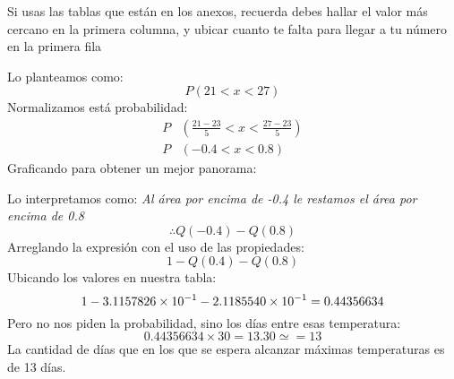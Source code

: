 \documentclass[
	12pt, %
	fleqn, %
	a4paper, %
	oneside, %
]{LegrandOrangeBook}
\begin{document}
\begin{remark}
Si usas las tablas que están en los anexos, recuerda debes hallar el valor más cercano en la primera columna, y ubicar cuanto te falta para llegar a tu  número en la primera fila
\end{remark}
\begin{example}
Lo planteamos como:
\begin{displaymath}
P(21<x<27)
\end{displaymath}
Normalizamos está probabilidad:
\begin{align*}
P&\left(\frac{21-23}{5}<x<\frac{27-23}{5}\right)\\
P&(-0.4<x<0.8)
\end{align*}
Graficando para obtener un mejor panorama:
\begin{center}
\end{center}
Lo interpretamos como: \emph{Al área por encima de -0.4 le restamos el área por encima de 0.8}
\begin{displaymath}
\therefore Q(-0.4)-Q(0.8)
\end{displaymath}
Arreglando la expresión con el uso de las propiedades:
\begin{displaymath}
1-Q(0.4)-Q(0.8)
\end{displaymath}
Ubicando los valores en nuestra tabla:
\begin{displaymath}
1-3.1157826\times 10^{-1}-2.1185540\times 10^{-1}=0.44356634
\end{displaymath}
Pero no nos piden la probabilidad, sino los días entre esas temperatura:
\begin{displaymath}
0.44356634\times 30=13.30\simeq =13
\end{displaymath}
La cantidad de días que en los que se espera alcanzar máximas temperaturas es de 13 días.
\end{example}
\end{document}

